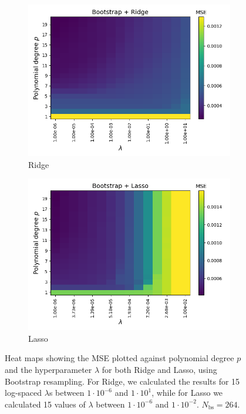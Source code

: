\documentclass[a4paper]{article}
\begin{document}
\begin{figure}[H]
  \centering
  \begin{subfigure}{0.49\textwidth}
    \includegraphics[scale=0.45]{../figures/task_g/Ridge/heatmap_bs_error_N22500_patch1_pmax20_nlamb15_Ridge_boot_Nbs264.png}
    \caption{Ridge}
  \end{subfigure}
  \begin{subfigure}{0.49\textwidth}
    \includegraphics[scale=0.45]{../figures/task_g/Lasso/heatmap_bs_error_N22500_patch1_pmax20_nlamb15_Lasso_boot_Nbs264.png}
    \caption{Lasso}
  \end{subfigure}
  \caption{Heat maps showing the MSE plotted against polynomial degree $p$ and the hyperparameter $\lambda$ for both Ridge and Lasso, using Bootstrap resampling. For Ridge, we calculated the results for 15 log-spaced $\lambda$s between $1\cdot10^{-6}$ and $1\cdot10^{1}$, while for Lasso we calculated 15 values of $\lambda$ between $1\cdot10^{-6}$ and $1\cdot10^{-2}$. $N_{\text{bs}} = 264$.}
  \label{fig:terrain_heatmap}
\end{figure}
\end{document}
